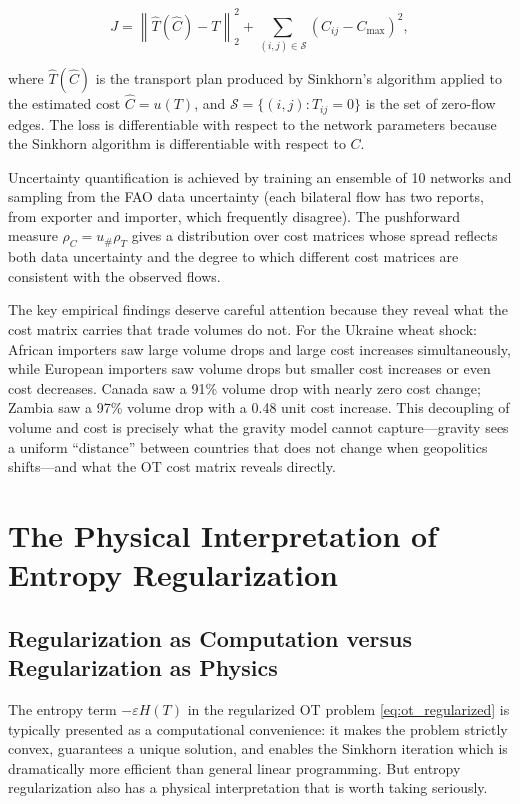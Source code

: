 \documentclass[12pt]{article}
\newcommand{\Tij}{T_{ij}}
\newcommand{\Cij}{C_{ij}}
\newcommand{\eps}{\varepsilon}
\begin{document}
\begin{equation}
J = \left\|\hat{T}(\hat{C}) - T\right\|_2^2 + \sum_{(i,j) \in \mathcal{S}} (\Cij - C_{\max})^2,
\label{eq:neural_loss}
\end{equation}

where $\hat{T}(\hat{C})$ is the transport plan produced by Sinkhorn's algorithm applied to the estimated cost $\hat{C} = u(T)$, and $\mathcal{S} = \{(i,j): \Tij = 0\}$ is the set of zero-flow edges. The loss is differentiable with respect to the network parameters because the Sinkhorn algorithm is differentiable with respect to $C$.

Uncertainty quantification is achieved by training an ensemble of 10 networks and sampling from the FAO data uncertainty (each bilateral flow has two reports, from exporter and importer, which frequently disagree). The pushforward measure $\rho_C = u_\# \rho_T$ gives a distribution over cost matrices whose spread reflects both data uncertainty and the degree to which different cost matrices are consistent with the observed flows.

The key empirical findings deserve careful attention because they reveal what the cost matrix carries that trade volumes do not. For the Ukraine wheat shock: African importers saw large volume drops and large cost increases simultaneously, while European importers saw volume drops but smaller cost increases or even cost decreases. Canada saw a 91\% volume drop with nearly zero cost change; Zambia saw a 97\% volume drop with a 0.48 unit cost increase. This decoupling of volume and cost is precisely what the gravity model cannot capture---gravity sees a uniform ``distance'' between countries that does not change when geopolitics shifts---and what the OT cost matrix reveals directly.

\section{The Physical Interpretation of Entropy Regularization}

\subsection{Regularization as Computation versus Regularization as Physics}

The entropy term $-\eps H(T)$ in the regularized OT problem \eqref{eq:ot_regularized} is typically presented as a computational convenience: it makes the problem strictly convex, guarantees a unique solution, and enables the Sinkhorn iteration which is dramatically more efficient than general linear programming. But entropy regularization also has a physical interpretation that is worth taking seriously.
\end{document}
